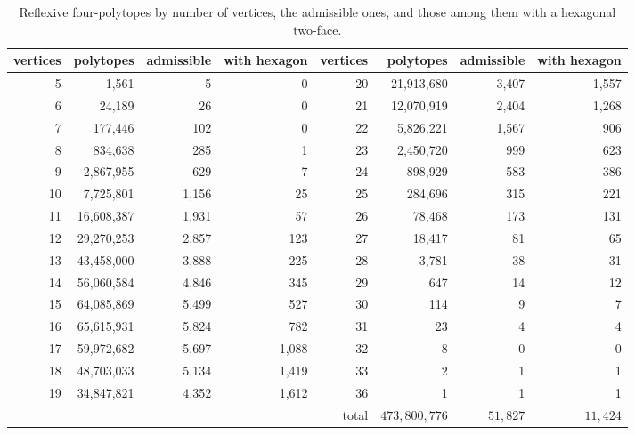 \begin{table}[ht]
\centering\small\setlength{\tabcolsep}{3.5pt}
\begin{tabular}{rrrr@{\qquad}rrrr}
vertices & polytopes & admissible & with hexagon & vertices & polytopes & admissible & with hexagon\\\hline
5 & 1{,}561 & 5 & 0 & 20 & 21{,}913{,}680 & 3{,}407 & 1{,}557\\
6 & 24{,}189 & 26 & 0 & 21 & 12{,}070{,}919 & 2{,}404 & 1{,}268\\
7 & 177{,}446 & 102 & 0 & 22 & 5{,}826{,}221 & 1{,}567 & 906\\
8 & 834{,}638 & 285 & 1 & 23 & 2{,}450{,}720 & 999 & 623\\
9 & 2{,}867{,}955 & 629 & 7 & 24 & 898{,}929 & 583 & 386\\
10 & 7{,}725{,}801 & 1{,}156 & 25 & 25 & 284{,}696 & 315 & 221\\
11 & 16{,}608{,}387 & 1{,}931 & 57 & 26 & 78{,}468 & 173 & 131\\
12 & 29{,}270{,}253 & 2{,}857 & 123 & 27 & 18{,}417 & 81 & 65\\
13 & 43{,}458{,}000 & 3{,}888 & 225 & 28 & 3{,}781 & 38 & 31\\
14 & 56{,}060{,}584 & 4{,}846 & 345 & 29 & 647 & 14 & 12\\
15 & 64{,}085{,}869 & 5{,}499 & 527 & 30 & 114 & 9 & 7\\
16 & 65{,}615{,}931 & 5{,}824 & 782 & 31 & 23 & 4 & 4\\
17 & 59{,}972{,}682 & 5{,}697 & 1{,}088 & 32 & 8 & 0 & 0\\
18 & 48{,}703{,}033 & 5{,}134 & 1{,}419 & 33 & 2 & 1 & 1\\
19 & 34{,}847{,}821 & 4{,}352 & 1{,}612 & 36 & 1 & 1 & 1\\\hline
& & & & total & $473{,}800{,}776$ & $51{,}827$ & $11{,}424$
\end{tabular}
\caption{Reflexive four-polytopes by number of vertices, the admissible ones, and those among them with a hexagonal
two-face.}\label{tab:Ucounts}
\end{table}

